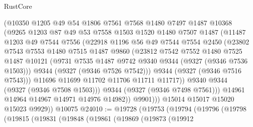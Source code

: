 \begin{lexlean}{RustCore}
\begin{coremodule}
                  (@10350
                    @1205
                    @49
                    @54
                    @1806
                    @7561
                    @7568
                    @1480
                    @7497
                    @1487
                    @10368
                    (@9265
                      @1203
                      @87
                      @49
                      @53
                      @7558
                      @1503
                      @1520
                      @1480
                      @7507
                      @1487
                      (@11487
                        @1203
                        @49
                        @7544
                        @7556
                        (@22918
                          @1196
                          @56
                          @49
                          @7544
                          @7554
                          @2450
                          (@23802
                            @7543
                            @7553
                            @1480
                            @7515
                            @1487
                            @9860
                            (@23812
                              @7542
                              @7552
                              @1480
                              @7525
                              @1487
                              @10121
                              (@9731 @7535 @1487 @9742 @9340 @9344 (@9327 (@9346 @7536 @1503)))
                              @9344
                              (@9327 (@9346 @7526 @7542)))
                            @9344
                            (@9327 (@9346 @7516 @7543)))
                          @11696
                          @11699
                          @11702
                          @11706
                          @11711
                          @11717))
                      @9340
                      @9344
                      (@9327 (@9346 @7508 @1503)))
                    @9344
                    (@9327 (@9346 @7498 @7561)))
                  @14961
                  @14964
                  @14967
                  @14971
                  @14976
                  @14982))
              @9901)))
        @15014
        @15017
        @15020
        @15023
        @9929))
    @10075
@24010 := @19728
    (@19753
      (@19794
        (@19796
          (@19798
            (@19815
              (@19831
                (@19848
                  (@19861
                    (@19869
                      (@19873
                        (@19912

\end{coremodule}
\end{lexlean}
